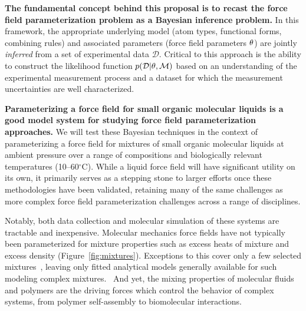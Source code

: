 \documentclass[aps,pre,twocolumn,nofootinbib,superscriptaddress,linenumbers]{revtex4-1}
\begin{document}
{\bf The fundamental concept behind this proposal is to recast the force field parameterization problem as a Bayesian inference problem.}
In this framework, the appropriate underlying model (atom types, functional forms, combining rules) and associated parameters (force field parameters ${\bf \theta}$) are jointly \emph{inferred} from a set of experimental data $\mathcal{D}$.
Critical to this approach is the ability to construct the likelihood function $p(\mathcal{D} | {\bf \theta}, \mathcal{M})$ based on an understanding of the experimental measurement process and a dataset for which the measurement uncertainties are well characterized.

%

{\bf Parameterizing a force field for small organic molecular liquids is a good model system for studying force field parameterization approaches.}
We will test these Bayesian techniques in the context of parameterizing a force field for mixtures of small organic molecular liquids at ambient pressure over a range of compositions and biologically relevant temperatures (10--60$^\circ$C).
While a liquid force field will have significant utility on its own, it primarily serves as a stepping stone to larger efforts once these methodologies have been validated, retaining many of the same challenges as more complex force field parameterization challenges across a range of disciplines.

Notably, both data collection and molecular simulation of these systems are tractable and inexpensive.
Molecular mechanics force fields have not typically been parameterized for mixture properties such as excess heats of mixture and excess density (Figure~\ref{fig:mixtures})\citep{nezbeda_methanol_mixtures_2006,vdS_mixtures_2003}. Exceptions to this cover only a few selected mixtures~\citep{chen_monte_2001,stubbs_transferable_2004}, leaving only fitted analytical models generally available for such modeling complex mixtures.~\citep{PolingLiquidProp,TDEbinary}
And yet, the mixing properties of molecular fluids and polymers are the driving forces which control the behavior of complex systems, from polymer self-assembly to biomolecular interactions.
\end{document}
